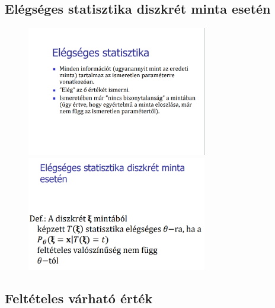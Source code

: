 \documentclass[12pt]{article}
\begin{document}
    \subsection{Elégséges statisztika diszkrét minta esetén}
    \begin{figure}[h]
        \centering
        \includegraphics[width=0.7\textwidth]{3.png}
        \includegraphics[width=0.7\textwidth]{4.png}
    \end{figure}

    
    \newpage
    \subsection{Feltételes várható érték}
\end{document}
